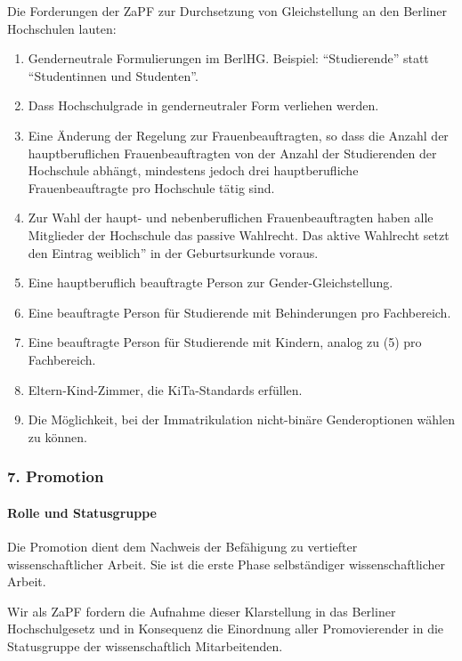 \documentclass[DIV=calc]{scrartcl}
\begin{document}
Die Forderungen der ZaPF zur Durchsetzung von Gleichstellung an den Berliner
Hochschulen lauten:
\begin{enumerate}
\def\labelenumi{\arabic{enumi})}
\item Genderneutrale Formulierungen im BerlHG. Beispiel:
  \enquote{Studierende} statt \enquote{Studentinnen und Studenten}.
\item Dass Hochschulgrade in genderneutraler Form verliehen werden.
\item Eine Änderung der Regelung zur Frauenbeauftragten, so dass die Anzahl
  der hauptberuflichen Frauenbeauftragten von der Anzahl der Studierenden der
  Hochschule abhängt, mindestens jedoch drei hauptberufliche Frauenbeauftragte
  pro Hochschule tätig sind.
\item Zur Wahl der haupt- und nebenberuflichen Frauenbeauftragten haben
  alle Mitglieder der Hochschule das passive Wahlrecht. Das aktive Wahlrecht
  setzt den Eintrag \glqq weiblich'' in der Geburtsurkunde voraus.
\item Eine hauptberuflich beauftragte Person zur Gender-Gleichstellung.
\item Eine beauftragte Person für Studierende mit Behinderungen %
  pro Fachbereich.
\item Eine beauftragte Person für Studierende mit Kindern, analog zu (5)
  pro Fachbereich.
\item Eltern-Kind-Zimmer, die KiTa-Standards erfüllen.
\item Die Möglichkeit, bei der Immatrikulation nicht-binäre Genderoptionen
  wählen zu können.
\end{enumerate}

\hypertarget{promotion}{%
\subsubsection*{7. Promotion}\label{promotion}}

\hypertarget{rolle-und-statusgruppe}{%
\paragraph{Rolle und Statusgruppe}\label{rolle-und-statusgruppe}}

Die Promotion dient dem Nachweis der Befähigung zu vertiefter wissenschaftlicher Arbeit. Sie ist die erste Phase selbständiger wissenschaftlicher Arbeit. 

Wir als ZaPF fordern die Aufnahme dieser Klarstellung in das Berliner Hochschulgesetz und in Konsequenz die Einordnung aller Promovierender in die Statusgruppe der wissenschaftlich %
Mitarbeitenden.
\end{document}
